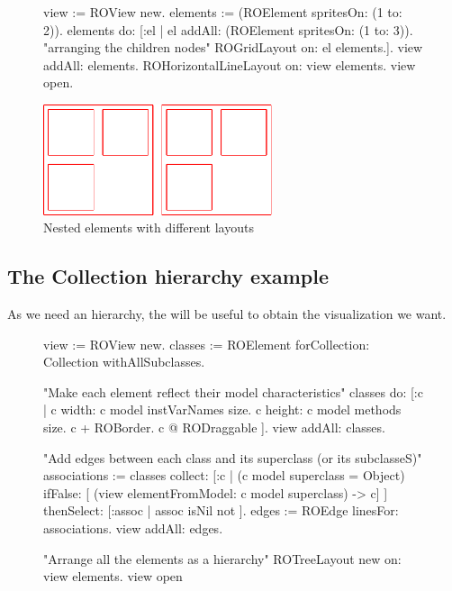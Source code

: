 \documentclass[a4paper,10pt,twoside]{book}
\begin{document}
\begin{figure}[H]
      \begin{minipage}[t]{0.61\textwidth}
      \vspace{0pt}
     \begin{code}{}
view := ROView new.
elements := (ROElement spritesOn: (1 to: 2)).
elements 
	do: [:el | el addAll: (ROElement spritesOn: (1 to: 3)). 
	           "arranging the children nodes"
			   ROGridLayout on: el elements.].			   
view addAll: elements.
ROHorizontalLineLayout on: view elements.
view open.
  \end{code}
   \end{minipage}
   \hfill
   \begin{minipage}[t]{0.6\textwidth}
      \vspace{0pt} \raggedright
       \centering
		\includegraphics[width=0.6\textwidth]{nestedLayout}
   \end{minipage}
\label{fig:nestedLayout}
\caption{Nested elements with different layouts }
\end{figure} 

\subsection*{The Collection hierarchy example}
As we need an hierarchy, the  will be useful to obtain the visualization we want.

\begin{figure}[H]
\begin{code}{}
view := ROView new.
classes := ROElement forCollection: Collection withAllSubclasses.

"Make each element reflect their model characteristics"
classes do: [:c | 
	c width: c model instVarNames size.
	c height: c model methods size.
	c + ROBorder. 
	c @ RODraggable ].
view addAll: classes.

"Add edges between each class and its superclass (or its subclasseS)"
associations := classes collect: [:c | 
	(c model superclass = Object)
		ifFalse: [ (view elementFromModel: c model superclass) -> c]
	 ] thenSelect: [:assoc | assoc isNil not ].
edges := ROEdge linesFor: associations.
view addAll: edges.

"Arrange all the elements as a hierarchy"
ROTreeLayout new on: view elements.
view open
\end{code}
\end{figure}
\end{document}
